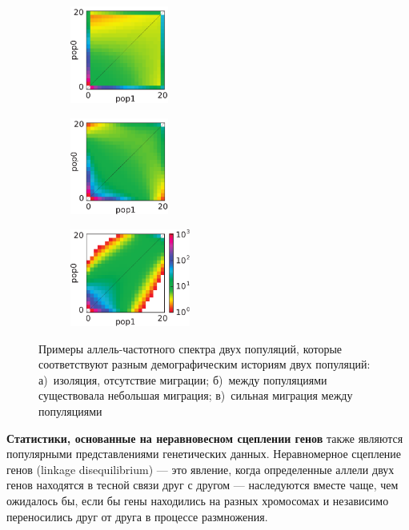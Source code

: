 \begin{figure}[b]
    \begin{subfigure}[b]{.33\textwidth}
    \includegraphics[height=3.2cm]{images/part1/data/example_afs_1.pdf}
    \caption{}
    \label{fig:example_afs_1}
    \end{subfigure}%
    \begin{subfigure}[b]{.33\textwidth}
    \includegraphics[height=3.2cm]{images/part1/data/example_afs_2.pdf}
    \caption{}
    \label{fig:example_afs_2}
    \end{subfigure}%
    \begin{subfigure}[b]{.33\textwidth}
    \includegraphics[height=3.2cm]{images/part1/data/example_afs_3.pdf}
    \caption{}
    \label{fig:example_afs_3}
    \end{subfigure}
    \caption{Примеры аллель-частотного спектра двух популяций, которые соответствуют разным демографическим историям двух популяций: а)~изоляция, отсутствие миграции; б)~между популяциями существовала небольшая миграция; в)~сильная миграция между популяциями}\label{afs_examples}
\end{figure}

\textbf{Статистики, основанные на неравновесном сцеплении генов} также являются популярными представлениями генетических данных.
Неравномерное сцепление генов (linkage disequilibrium) --- это явление, когда определенные аллели двух генов находятся в тесной связи друг с другом --- наследуются вместе чаще, чем ожидалось бы, если бы гены находились на разных хромосомах и независимо переносились друг от друга в процессе размножения.

